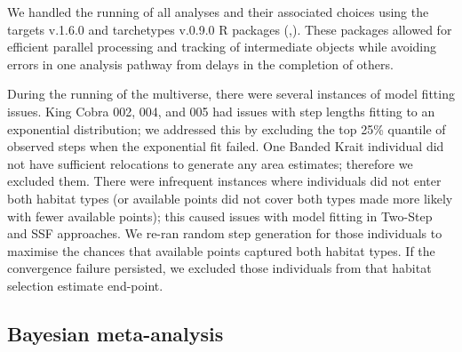 \documentclass[10pt,a4paper]{article}
\begin{document}
We handled the running of all analyses and their associated choices using the targets v.1.6.0 and tarchetypes v.0.9.0 R packages (,).
These packages allowed for efficient parallel processing and tracking of intermediate objects while avoiding errors in one analysis pathway from delays in the completion of others.

During the running of the multiverse, there were several instances of model fitting issues.
King Cobra 002, 004, and 005 had issues with step lengths fitting to an exponential distribution; we addressed this by excluding the top 25\% quantile of observed steps when the exponential fit failed.
One Banded Krait individual did not have sufficient relocations to generate any area estimates; therefore we excluded them.
There were infrequent instances where individuals did not enter both habitat types (or available points did not cover both types made more likely with fewer available points); this caused issues with model fitting in Two-Step and SSF approaches.
We re-ran random step generation for those individuals to maximise the chances that available points captured both habitat types.
If the convergence failure persisted, we excluded those individuals from that habitat selection estimate end-point.

\subsection{Bayesian meta-analysis}\label{bayesian-meta-analysis}
\end{document}
